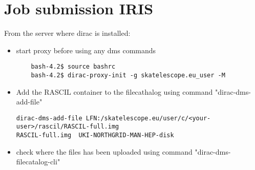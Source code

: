 \documentclass[english]{article}
\begin{document}
\section{Job submission IRIS}
From the server where dirac is installed:
\begin{itemize}
    \item start proxy before using any dms commands
    \begin{verbatim}
    bash-4.2$ source bashrc
    bash-4.2$ dirac-proxy-init -g skatelescope.eu_user -M
    \end{verbatim}

 \item Add the RASCIL container to the filecathalog using command "dirac-dms-add-file"  
  \begin{verbatim}
dirac-dms-add-file LFN:/skatelescope.eu/user/c/<your-user>/rascil/RASCIL-full.img  
RASCIL-full.img  UKI-NORTHGRID-MAN-HEP-disk
\end{verbatim}

\item check where the files has been uploaded using command "dirac-dms-filecatalog-cli"

\end{itemize}
\end{document}

